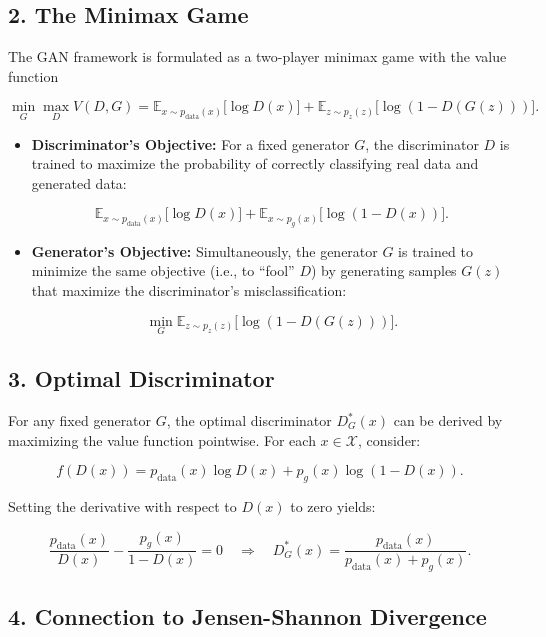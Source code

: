 \documentclass{article}
\begin{document}
\subsection*{2. The Minimax Game}

The GAN framework is formulated as a two-player minimax game with the value function

\[
\min_{G} \max_{D} V(D,G) = \mathbb{E}_{x\sim p_{\text{data}}(x)}\big[\log D(x)\big] + \mathbb{E}_{z\sim p_z(z)}\big[\log (1 - D(G(z)))\big].
\]

\begin{itemize}
    \item \textbf{Discriminator’s Objective:}
    For a fixed generator $ G $, the discriminator $ D $ is trained to maximize the probability of correctly classifying real data and generated data:

    \[
    \mathbb{E}_{x\sim p_{\text{data}}(x)}\big[\log D(x)\big] + \mathbb{E}_{x\sim p_g(x)}\big[\log (1 - D(x))\big].
    \]

    \item \textbf{Generator’s Objective:}
    Simultaneously, the generator $ G $ is trained to minimize the same objective (i.e., to “fool” $ D $) by generating samples $ G(z) $ that maximize the discriminator's misclassification:

    \[
    \min_{G} \mathbb{E}_{z\sim p_z(z)}\big[\log (1 - D(G(z)))\big].
    \]
\end{itemize}

\subsection*{3. Optimal Discriminator}

For any fixed generator $ G $, the optimal discriminator $ D^*_G(x) $ can be derived by maximizing the value function pointwise. For each $ x \in \mathcal{X} $, consider:

\[
f(D(x)) = p_{\text{data}}(x) \log D(x) + p_g(x) \log (1 - D(x)).
\]

Setting the derivative with respect to $ D(x) $ to zero yields:

\begin{equation}
\frac{p_{\text{data}}(x)}{D(x)} - \frac{p_g(x)}{1-D(x)} = 0 \quad \Longrightarrow \quad D^*_G(x) = \frac{p_{\text{data}}(x)}{p_{\text{data}}(x) + p_g(x)}.
\end{equation}

\subsection*{4. Connection to Jensen-Shannon Divergence}
\end{document}
